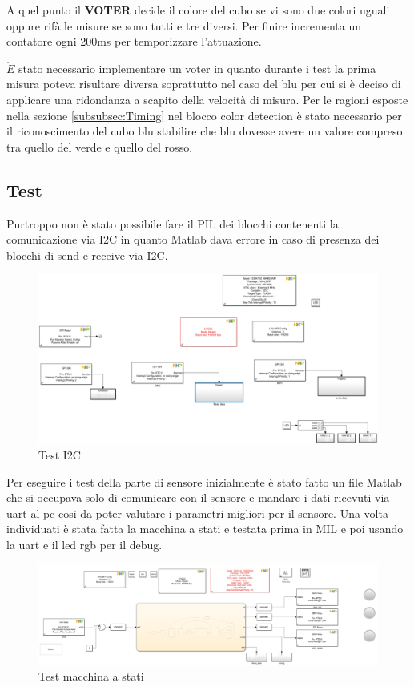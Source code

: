 \documentclass[12pt]{report}
\begin{document}
A quel punto il \textbf{VOTER} decide il colore del cubo se vi sono due colori uguali oppure rifà le misure se sono tutti e tre diversi. Per finire incrementa un contatore ogni 200ms per temporizzare l'attuazione.

$\grave{E}$ stato necessario implementare un voter in quanto durante i test la prima misura poteva risultare diversa soprattutto nel caso del blu per cui si è deciso di applicare una ridondanza a scapito della 
velocità di misura. Per le ragioni esposte nella sezione \ref{subsubsec:Timing} nel blocco color detection è stato necessario per il riconoscimento del cubo blu stabilire che blu dovesse avere un valore 
compreso tra quello del verde e quello del rosso.

\subsection{Test}

Purtroppo non è stato possibile fare il PIL dei blocchi contenenti la comunicazione via I2C in quanto Matlab dava errore in caso di presenza dei blocchi di send e receive via I2C.

\begin{figure}[h] 
    \centering
    \includegraphics[width=0.6\linewidth]{images/Immagini sensore/i2c_test.png}
    \caption{Test I2C}
\end{figure}
Per eseguire i test della parte di sensore inizialmente è stato fatto un file Matlab che si occupava solo di comunicare con il sensore e mandare i dati ricevuti via uart al pc così da poter valutare i parametri migliori per il sensore.
Una volta individuati è stata fatta la macchina a stati e testata prima in MIL e poi usando la uart e il led rgb per il debug.
\begin{figure}[h] 
    \centering
    \includegraphics[width=0.75\linewidth]{images/Immagini sensore/test_stateflow_2.png}
    \caption{Test macchina a stati}
\end{figure}
\end{document}
